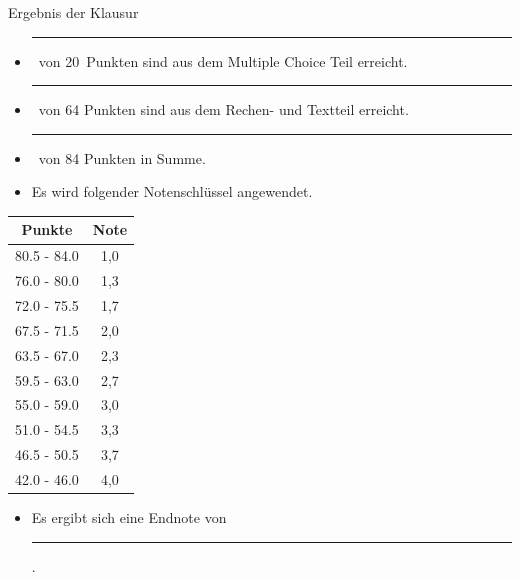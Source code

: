 \documentclass[a4paper, 10pt]{scrartcl}\usepackage[]{graphicx}\usepackage[]{xcolor}
\begin{document}
\begin{graybox}{Ergebnis der Klausur}
  \vspace{1Ex}
  \begin{itemize}
  \item[] \rule[0ex]{3em}{.4pt}\, von 20\, Punkten sind aus dem Multiple
    Choice Teil erreicht.
  \item[] \rule[0ex]{3em}{.4pt}\, von 64 Punkten sind aus dem Rechen- und
    Textteil erreicht. 
  \item[] \rule[0ex]{3em}{.4pt}\, von 84 Punkten in Summe.
  \item[] Es wird folgender Notenschlüssel angewendet.   
  \end{itemize}
  \vspace{1ex}
\begin{center}
  \begin{tabular}[c]{cc}
    \toprule
    \textbf{Punkte}	&	\textbf{Note}	\\
    \midrule
    80.5 - 84.0	&	1,0	\\
    76.0 - 80.0	&	1,3	\\
    72.0 - 75.5	&	1,7	\\
    67.5 - 71.5	&	2,0	\\
    63.5 - 67.0	&	2,3	\\
    59.5 - 63.0	&	2,7	\\
    55.0 - 59.0	&	3,0	\\
    51.0 - 54.5	&	3,3	\\
    46.5 - 50.5	&	3,7	\\
    42.0 - 46.0	&	4,0	\\
    \bottomrule
  \end{tabular}
\end{center}
  \vspace{1ex}
\begin{itemize}
\item[] Es ergibt sich eine Endnote von \rule[0ex]{4em}{.4pt}.
\end{itemize}
  \vspace{1Ex}
\end{graybox}

\newpage
\end{document}
